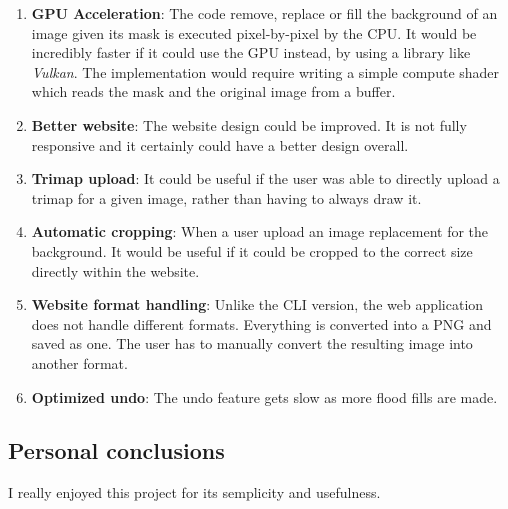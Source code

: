 \documentclass[a4paper]{article}
\begin{document}
\begin{enumerate}
    \item \textbf{GPU Acceleration}: The code remove, replace or fill the background
    of an image given its mask is executed pixel-by-pixel by the CPU.
    It would be incredibly faster if it could use the GPU instead, by using
    a library like \textit{Vulkan}. The implementation would require
    writing a simple compute shader which reads the mask and the original image
    from a buffer.
    \item \textbf{Better website}: The website design could be improved. It is not
    fully responsive and it certainly could have a better design overall.
    \item \textbf{Trimap upload}: It could be useful if the user was able to
    directly upload a trimap for a given image, rather than having to always draw it.
    \item \textbf{Automatic cropping}: When a user upload an image replacement for the background.
    It would be useful if it could be cropped to the correct size directly within the website.
    \item \textbf{Website format handling}: Unlike the CLI version, the web application does
    not handle different formats. Everything is converted into a PNG and saved as one.
    The user has to manually convert the resulting image into another format.
    \item \textbf{Optimized undo}: The undo feature gets slow as more
    flood fills are made.
\end{enumerate}

\subsection{Personal conclusions}

I really enjoyed this project for its semplicity and usefulness.

\pagebreak

\listoffigures

\pagebreak

\nocite{*} %

\printbibliography

\pagebreak

\printnoidxglossary
\end{document}
